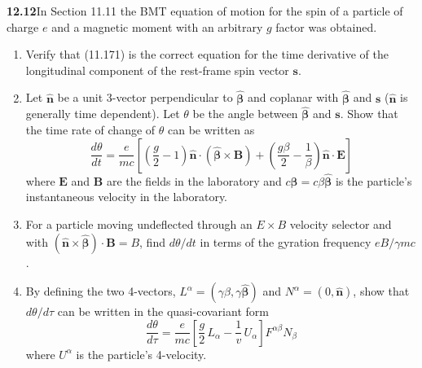 \par\bigskip
\noindent\textbf{12.12}\quad In Section 11.11 the BMT equation of motion for the spin of a particle of charge $e$ and a magnetic moment with an arbitrary $g$ factor was obtained.
\begin{enumerate}
\item[(a)] Verify that (11.171) is the correct equation for the time derivative of the longitudinal component of the rest-frame spin vector $\mathbf{s}$.
\item[(b)] Let $\hat{\mathbf{n}}$ be a unit 3-vector perpendicular to $\hat{\boldsymbol{\beta}}$ and coplanar with $\hat{\boldsymbol{\beta}}$ and $\mathbf{s}$ ($\hat{\mathbf{n}}$ is generally time dependent). Let $\theta$ be the angle between $\hat{\boldsymbol{\beta}}$ and $\mathbf{s}$. Show that the time rate of change of $\theta$ can be written as
\[
\frac{d\theta}{dt}=\frac{e}{mc}\left[\left(\frac{g}{2}-1\right)\!\hat{\mathbf{n}}\cdot(\hat{\boldsymbol{\beta}}\times\mathbf{B})+\left(\frac{g\beta}{2}-\frac{1}{\beta}\right)\!\hat{\mathbf{n}}\cdot\mathbf{E}\right]
\]
where $\mathbf{E}$ and $\mathbf{B}$ are the fields in the laboratory and $c\boldsymbol{\beta}=c\beta\hat{\boldsymbol{\beta}}$ is the particle's instantaneous velocity in the laboratory.
\item[(c)] For a particle moving undeflected through an $E\times B$ velocity selector and with $(\hat{\mathbf{n}}\times\hat{\boldsymbol{\beta}})\cdot\mathbf{B}=B$, find $d\theta/dt$ in terms of the gyration frequency $eB/\gamma mc$.
\item[(d)] By defining the two 4-vectors, $L^{\alpha}=(\gamma\beta,\gamma\hat{\boldsymbol{\beta}})$ and $N^{\alpha}=(0,\hat{\mathbf{n}})$, show that $d\theta/d\tau$ can be written in the quasi-covariant form
\[
\frac{d\theta}{d\tau}=\frac{e}{mc}\left[\frac{g}{2}\,L_{\alpha}-\frac{1}{v}\,U_{\alpha}\right]\!F^{\alpha\beta}N_{\beta}
\]
where $U^{\alpha}$ is the particle's 4-velocity.
\end{enumerate}
\solution

